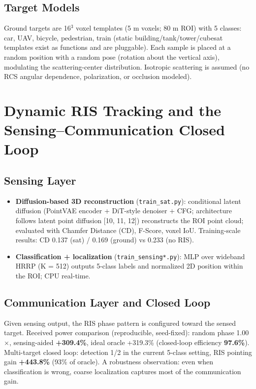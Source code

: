 \documentclass[11pt]{article}
\begin{document}
\subsection{Target Models}

Ground targets are 16$^3$ voxel templates (5 m voxels; 80 m ROI) with 5 classes: car, UAV, bicycle, pedestrian, train (static building/tank/tower/cubesat templates exist as functions and are pluggable). Each sample is placed at a random position with a random pose (rotation about the vertical axis), modulating the scattering-center distribution. Isotropic scattering is assumed (no RCS angular dependence, polarization, or occlusion modeled).


\section{Dynamic RIS Tracking and the Sensing--Communication Closed Loop}

\subsection{Sensing Layer}

\begin{itemize}
\item \textbf{Diffusion-based 3D reconstruction} (\texttt{train\_sat.py}): conditional latent diffusion (PointVAE encoder + DiT-style denoiser + CFG; architecture follows latent point diffusion [10, 11, 12]) reconstructs the ROI point cloud; evaluated with Chamfer Distance (CD), F-Score, voxel IoU. Training-scale results: CD 0.137 (sat) / 0.169 (ground) vs 0.233 (no RIS).
\item \textbf{Classification + localization} (\texttt{train\_sensing*.py}): MLP over wideband HRRP (K = 512) outputs 5-class labels and normalized 2D position within the ROI; CPU real-time.
\end{itemize}

\subsection{Communication Layer and Closed Loop}

Given sensing output, the RIS phase pattern is configured toward the sensed target. Received power comparison (reproducible, seed-fixed): random phase 1.00$\times$, sensing-aided \textbf{+309.4\%}, ideal oracle +319.3\% (closed-loop efficiency \textbf{97.6\%}). Multi-target closed loop: detection 1/2 in the current 5-class setting, RIS pointing gain \textbf{+443.8\%} (93\% of oracle). A robustness observation: even when classification is wrong, coarse localization captures most of the communication gain.
\end{document}
